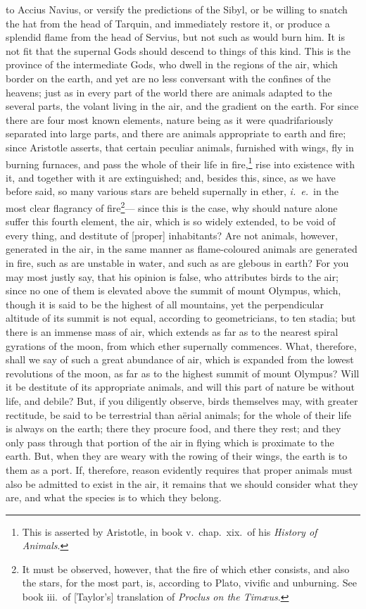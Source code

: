 \documentclass{article}
\begin{document}
to Accius Navius, or versify the predictions of the Sibyl, or be willing to
snatch the hat from the head of Tarquin, and immediately restore it, or produce
a splendid flame from the head of Servius, but not such as would burn him. It
is not fit that the supernal Gods should descend to things of this kind. This
is the province of the intermediate Gods, who dwell in the regions of the air,
which border on the earth, and yet are no less conversant with the confines of
the heavens; just as in every part of the world there are animals adapted to
the several parts, the volant living in the air, and the gradient on the earth.
For since there are four most known elements, nature being as it were
quadrifariously separated into large parts, and there are animals appropriate
to earth and fire; since Aristotle asserts, that certain peculiar animals,
furnished with wings, fly in burning furnaces, and pass the whole of their life
in fire,\footnote{This is asserted by Aristotle, in book v.~chap.~xix.~of his
\textit{History of Animals}.} rise into existence with it, and together with it
are extinguished; and, besides this, since, as we have before said, so many
various stars are beheld supernally in ether, \textit{i.~e.}~in the most clear
flagrancy of fire\footnote{It must be observed, however, that the fire of which
ether consists, and also the stars, for the most part, is, according to Plato,
vivific and unburning. See book iii.~of [Taylor's] translation of
\textit{Proclus on the Tim{\ae}us}.}--- since this is the case, why should
nature alone suffer this fourth element, the air, which is so widely extended,
to be void of every thing, and destitute of [proper] inhabitants?  Are not
animals, however, generated in the air, in the same manner as flame-coloured
animals are generated in fire, such as are unstable in water, and such as are
glebous in earth? For you may most justly say, that his opinion is false, who
attributes birds to the air; since no one of them is elevated above the summit
of mount Olympus, which, though it is said to be the highest of all mountains,
yet the perpendicular altitude of its summit is not equal, according to
geometricians, to ten stadia; but there is an immense mass of air, which
extends as far as to the nearest spiral gyrations of the moon, from which ether
supernally commences. What, therefore, shall we say of such a great abundance
of air, which is expanded from the lowest revolutions of the moon, as far as to
the highest summit of mount Olympus? Will it be destitute of its appropriate
animals, and will this part of nature be without life, and debile? But, if you
diligently observe, birds themselves may, with greater rectitude, be said to be
terrestrial than a\"{e}rial animals; for the whole of their life is always on
the earth; there they procure food, and there they rest; and they only pass
through that portion of the air in flying which is proximate to the earth. But,
when they are weary with the rowing of their wings, the earth is to them as a
port. If, therefore, reason evidently requires that proper animals must also be
admitted to exist in the air, it remains that we should consider what they are,
and what the species is to which they belong.
\end{document}
